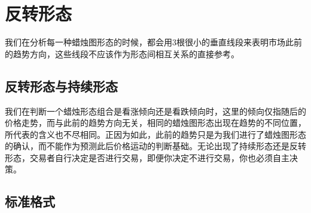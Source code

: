 \chapter{反转形态}
我们在分析每一种蜡烛图形态的时候，都会用3根很小的垂直线段来表明市场此前的趋势方向，这些线段不应该作为形态间相互关系的直接参考。
\section{反转形态与持续形态}
我们在判断一个蜡烛形态组合是看涨倾向还是看跌倾向时，这里的倾向仅指随后的价格走势，而与此前的趋势方向无关，相同的蜡烛图形态出现在趋势的不同位置，所代表的含义也不尽相同。正因为如此，此前的趋势只是为我们进行了蜡烛图形态的确认，而不能作为预测此后价格运动的判断基础。无论出现了持续形态还是反转形态，交易者自行决定是否进行交易，即便你决定不进行交易，你也必须自主决策。
\section{标准格式}
